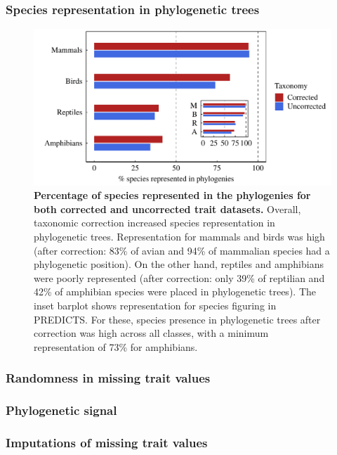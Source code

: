 \subsubsection{Species representation in phylogenetic trees}
\begin{figure}[h!]
\centering
\includegraphics[scale=0.7]{figures/chapter2/Species_representation_phylo}
\caption[Percentage of species represented in the phylogenies for both corrected and uncorrected trait datasets]{\textbf{Percentage of species represented in the phylogenies for both corrected and uncorrected trait datasets.} Overall, taxonomic correction increased species representation in phylogenetic trees. Representation for mammals and birds was high (after correction: 83\% of avian and 94\% of mammalian species had a phylogenetic position). On the other hand, reptiles and amphibians were poorly represented (after correction: only 39\% of reptilian and 42\% of amphibian species were placed in phylogenetic trees). The inset barplot shows representation for species figuring in PREDICTS. For these, species presence in phylogenetic trees after correction was high across all classes, with a minimum representation of 73\% for amphibians.}
\end{figure}

\subsubsection{Randomness in missing trait values}

\subsubsection{Phylogenetic signal}

\subsubsection{Imputations of missing trait values}

